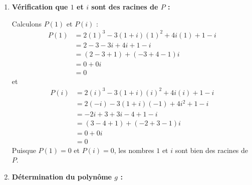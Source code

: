 \documentclass[12pt,a4paper]{article}
\begin{document}
\begin{enumerate}
    \item \textbf{Vérification que $1$ et $i$ sont des racines de $P$ :}
    
    Calculons $P(1)$ et $P(i)$ :
    $$
    \begin{aligned}
        P(1) &= 2(1)^3 - 3(1 + i)(1)^2 + 4i(1) + 1 - i \\
        &= 2 - 3 - 3i + 4i + 1 - i \\
        &= (2 - 3 + 1) + (-3 + 4 - 1)i \\
        &= 0 + 0i \\
        &= 0
    \end{aligned}
    $$
    et
    $$
    \begin{aligned}
        P(i) &= 2(i)^3 - 3(1 + i)(i)^2 + 4i(i) + 1 - i \\
        &= 2(-i) - 3(1 + i)(-1) + 4i^2 + 1 - i \\
        &= -2i + 3 + 3i - 4 + 1 - i \\
        &= (3 - 4 + 1) + (-2 + 3 - 1)i \\
        &= 0 + 0i \\
        &= 0
    \end{aligned}
    $$
    Puisque $P(1) = 0$ et $P(i) = 0$, les nombres $1$ et $i$ sont bien des racines de $P$.

    \item \textbf{Détermination du polynôme $g$ :}
    

\end{enumerate}
\end{document}
